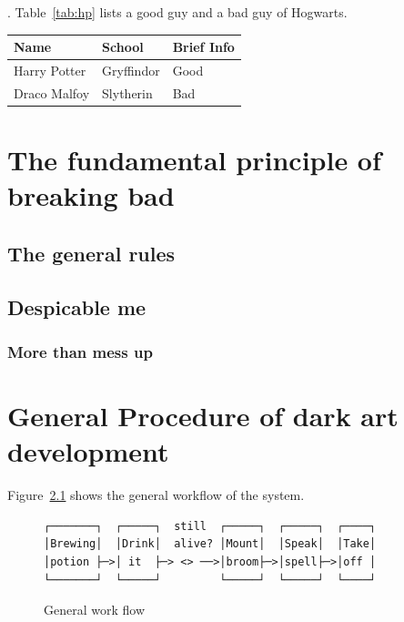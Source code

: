 \documentclass{swfuthesise}
\begin{document}
\lipsum[][2]. Table~\ref{tab:hp} lists a good guy and a bad guy of Hogwarts. 

\begin{center}\singlespacing
  \begin{tabular}{lll}
    \toprule
    Name&School&Brief Info\\\midrule
    Harry Potter&Gryffindor&Good\\
    Draco Malfoy&Slytherin&Bad\\\bottomrule
  \end{tabular}      
\end{center}

\lipsum[7-8]

\chapter{The fundamental principle of breaking bad}

\lipsum[150]

\section{The general rules}

\lipsum[16-18]

\section{Despicable me}

\lipsum[19-20]

\subsection{More than mess up}

\lipsum[21-23]

\chapter{General Procedure of dark art development}
\label{cha:gener-proc-spells}

\lipsum[31] Figure~\ref{fig:workflow} shows the general workflow of the system.

\begin{figure}[!ht]
  \centering
  \begin{minipage}{.8\linewidth}
\begin{verbatim}
┌───────┐  ┌─────┐  still  ┌─────┐  ┌─────┐  ┌────┐
│Brewing│  │Drink│  alive? │Mount│  │Speak│  │Take│
│potion ├─>│ it  ├─> <> ──>│broom├─>│spell├─>│off │
└───────┘  └─────┘         └─────┘  └─────┘  └────┘ 
\end{verbatim}
  \end{minipage}
  \caption{General work flow}
  \label{fig:workflow}
\end{figure}
\end{document}
